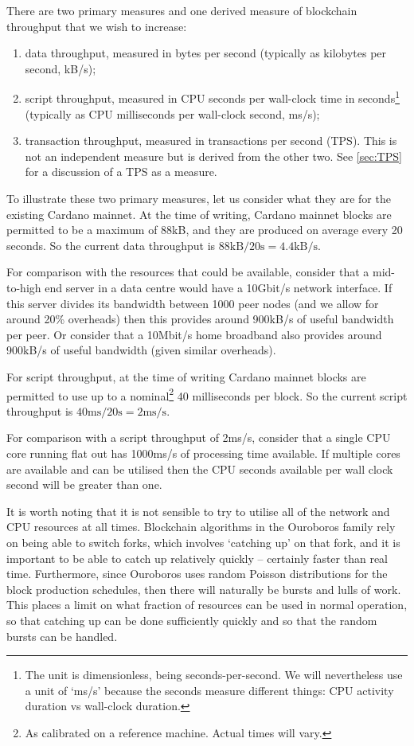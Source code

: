 \documentclass[11pt,a4paper]{article}
\begin{document}
There are two primary measures and one derived measure of blockchain throughput
that we wish to increase:
\begin{enumerate}
\item data throughput, measured in bytes per second (typically as kilobytes per
      second, kB/s);
\item script throughput, measured in CPU seconds per wall-clock time in
      seconds\footnote{The unit is dimensionless, being seconds-per-second. We
      will nevertheless use a unit of `ms/s' because the seconds
      measure different things: CPU activity duration vs wall-clock duration.}
      (typically as CPU milliseconds per wall-clock second, ms/s);
\item transaction throughput, measured in transactions per second (TPS). This is
      not an independent measure but is derived from the other two.
      See \cref{sec:TPS} for a discussion of a TPS as a measure.
\end{enumerate}

To illustrate these two primary measures, let us consider what they are for the
existing Cardano mainnet. At the time of writing, Cardano mainnet blocks are
permitted to be a maximum of 88kB, and they are produced on average every 20
seconds. So the current data throughput is $88\text{kB} / 20\text{s} = 4.4\text{kB/s}$.

For comparison with the resources that could be available, consider that a
mid-to-high end server in a data centre would have a 10Gbit/s network interface.
If this server divides its bandwidth between 1000 peer nodes (and we allow for
around 20\% overheads) then this provides around 900kB/s of useful bandwidth
per peer. Or consider that a 10Mbit/s home broadband also provides around
900kB/s of useful bandwidth (given similar overheads).

For script throughput, at the time of writing Cardano mainnet blocks are
permitted to use up to a nominal\footnote{As calibrated on a reference machine.
Actual times will vary.} 40 milliseconds per block. So the current script
throughput is $40\text{ms} / 20\text{s} = 2\text{ms/s}$.

For comparison with a script throughput of 2ms/s, consider that a single CPU
core running flat out has 1000ms/s of processing time available. If multiple
cores are available and can be utilised then the CPU seconds available per wall
clock second will be greater than one.

It is worth noting that it is not sensible to try to utilise all of the network
and CPU resources at all times. Blockchain algorithms in the Ouroboros family
rely on being able to switch forks, which involves `catching up' on that fork,
and it is important to be able to catch up relatively quickly -- certainly
faster than real time. Furthermore, since Ouroboros uses random Poisson
distributions for the block production schedules, then there will naturally be
bursts and lulls of work. This places a limit on what fraction of resources can
be used in normal operation, so that catching up can be done sufficiently
quickly and so that the random bursts can be handled.
\end{document}
